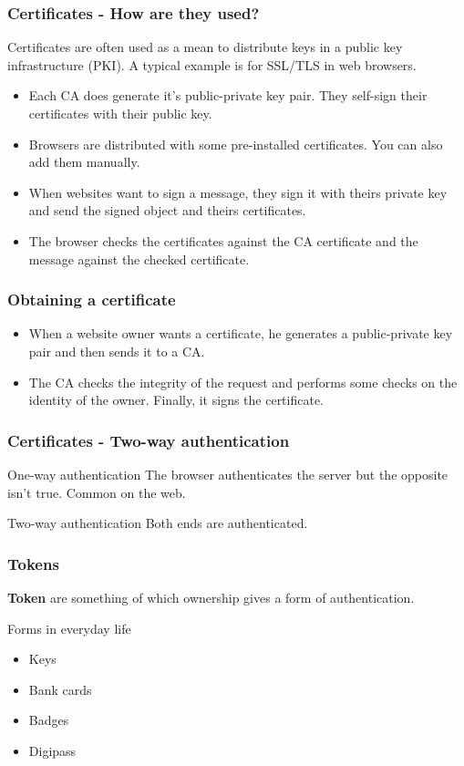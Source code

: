\begin{frame}
\frametitle{Certificates - How are they used?}
Certificates are often used as a mean to distribute keys in a public
key infrastructure (PKI).
A typical example is for SSL/TLS in web browsers.
\begin{itemize}
\item Each CA does generate it's public-private key pair. They
  self-sign their certificates with their public key.
\item Browsers are distributed with some pre-installed certificates.
  You can also add them manually.
\item When websites want to sign a message, they sign it with
  theirs private key and send the signed object and theirs certificates.
\item The browser checks the certificates against the CA
  certificate and the message against the checked certificate.
\end{itemize}
\end{frame}

\begin{frame}
\frametitle{Obtaining a certificate}
\begin{itemize}
\item When a website owner wants a certificate, he generates a public-private
key pair and then sends it to a CA.
\item The CA checks the integrity of the request and performs some checks on
the identity of the owner. Finally, it signs the certificate.
\end{itemize}
\end{frame}

\begin{frame}
\frametitle{Certificates - Two-way authentication}
\begin{block}{One-way authentication}
The browser authenticates the server but the opposite isn't true.
\newline Common on the web.
\end{block}
\begin{block}{Two-way authentication}
Both ends are authenticated.
\end{block}
\end{frame}

\begin{frame}
\frametitle{Tokens}
\textbf{Token} are something of which ownership gives a form of
authentication.
\begin{exampleblock}{Forms in everyday life}
\begin{itemize}
\item Keys
\item Bank cards
\item Badges
\item Digipass
\end{itemize}
\end{exampleblock}
\end{frame}

